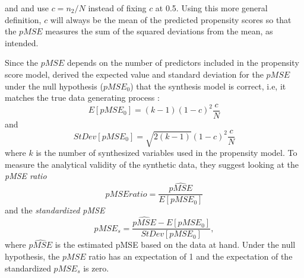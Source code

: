 \citet{Woo_Reiter_Oganian_Karr_2009} and \citet{Snoke_RSSA2018} and use $c=n_2/N$ instead of fixing $c$ at 0.5. Using this more general definition, $c$ will always be the mean of the predicted propensity scores so that the $pMSE$ measures the sum of the squared deviations from the mean, as intended. 

Since the $pMSE$ depends on the number of predictors included in the propensity score model, \textcite{Snoke_RSSA2018} derived the expected value and standard deviation for the $pMSE$ under the null hypothesis ($pMSE_0$) that the synthesis model is correct, i.e, it matches the true data generating process \parencite[Equation 1]{Snoke_RSSA2018}:
$$
E[pMSE_0] = (k-1)(1-c)^2 \frac{c}{N}
$$
and
$$
StDev[pMSE_0] = \sqrt{2(k-1)}(1-c)^2 \frac{c}{N}
$$
where $k$ is the number of synthesized variables used in the propensity model. To measure the analytical validity of the synthetic data, they suggest looking at the \textit{pMSE  ratio}
$$
pMSE ratio = \frac{\widehat{pMSE}}{E[pMSE_0]}
$$
and the \textit{standardized pMSE}
$$
pMSE_s =\frac{\widehat{pMSE}-E[pMSE_0]}{StDev[pMSE_0]},
$$
where $\widehat{pMSE}$ is the estimated pMSE based on the data at hand. Under the null hypothesis, the $pMSE$ ratio has an expectation of 1 and the expectation of the standardized $pMSE_s$ is zero.

